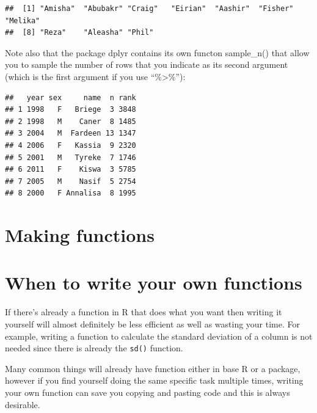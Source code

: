 \documentclass[]{book}
\newenvironment{Shaded}{\begin{snugshade}}{\end{snugshade}}
\newcommand{\DecValTok}[1]{\textcolor[rgb]{0.00,0.00,0.81}{#1}}
\newcommand{\KeywordTok}[1]{\textcolor[rgb]{0.13,0.29,0.53}{\textbf{#1}}}
\newcommand{\NormalTok}[1]{#1}
\newcommand{\OperatorTok}[1]{\textcolor[rgb]{0.81,0.36,0.00}{\textbf{#1}}}
\newcommand{\StringTok}[1]{\textcolor[rgb]{0.31,0.60,0.02}{#1}}
\begin{document}
\begin{verbatim}
##  [1] "Amisha"  "Abubakr" "Craig"   "Eirian"  "Aashir"  "Fisher"  "Melika" 
##  [8] "Reza"    "Aleasha" "Phil"
\end{verbatim}

Note also that the package dplyr contains its own functon sample\_n() that allow you to sample the number of rows that you indicate as its second argument (which is the first argument if you use ``\%\textgreater{}\%''):

\begin{Shaded}
\end{Shaded}

\begin{verbatim}
##   year sex     name  n rank
## 1 1998   F   Briege  3 3848
## 2 1998   M    Caner  8 1485
## 3 2004   M  Fardeen 13 1347
## 4 2006   F   Kassia  9 2320
## 5 2001   M   Tyreke  7 1746
## 6 2011   F    Kiswa  3 5785
## 7 2005   M    Nasif  5 2754
## 8 2000   F Annalisa  8 1995
\end{verbatim}

\hypertarget{making-functions}{%
\section{Making functions}\label{making-functions}}

\hypertarget{when-to-write-your-own-functions}{%
\section{When to write your own functions}\label{when-to-write-your-own-functions}}

If there's already a function in R that does what you want then writing it yourself will almost definitely be less efficient as well as wasting your time. For example, writing a function to calculate the standard deviation of a column is not needed since there is already the \texttt{sd()} function.

Many common things will already have function either in base R or a package, however if you find yourself doing the same specific task multiple times, writing your own function can save you copying and pasting code and this is always desirable.
\end{document}
